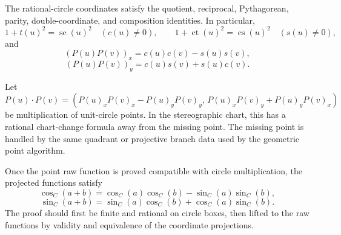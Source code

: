 \begin{theorem}
\label{thm:rational-circle-basic-identities}
\leanok
The rational-circle coordinates satisfy the quotient, reciprocal,
Pythagorean, parity, double-coordinate, and composition identities.  In
particular,
\[
  1+t(u)^2=\operatorname{sc}(u)^2\quad(c(u)\ne0),
  \qquad
  1+\operatorname{ct}(u)^2=\operatorname{cs}(u)^2\quad(s(u)\ne0),
\]
and
\[
  (P(u)P(v))_x=c(u)c(v)-s(u)s(v),
\]
\[
  (P(u)P(v))_y=c(u)s(v)+s(u)c(v).
\]
\end{theorem}

\begin{theorem}
\label{thm:rational-circle-group-law}
Let
\[
  P(u)\cdot P(v)
  =
  (P(u)_xP(v)_x-P(u)_yP(v)_y,\,
   P(u)_xP(v)_y+P(u)_yP(v)_x)
\]
be multiplication of unit-circle points.  In the stereographic chart, this
has a rational chart-change formula away from the missing point.  The missing
point is handled by the same quadrant or projective branch data used by the
geometric point algorithm.
\end{theorem}

\begin{theorem}
\label{thm:geometric-addition-formulas}
Once the point raw function is proved compatible with circle multiplication,
the projected functions satisfy
\[
  \cos_C(a+b)=\cos_C(a)\cos_C(b)-\sin_C(a)\sin_C(b),
\]
\[
  \sin_C(a+b)=\sin_C(a)\cos_C(b)+\cos_C(a)\sin_C(b).
\]
The proof should first be finite and rational on circle boxes, then lifted to
the raw functions by validity and equivalence of the coordinate projections.
\end{theorem}

